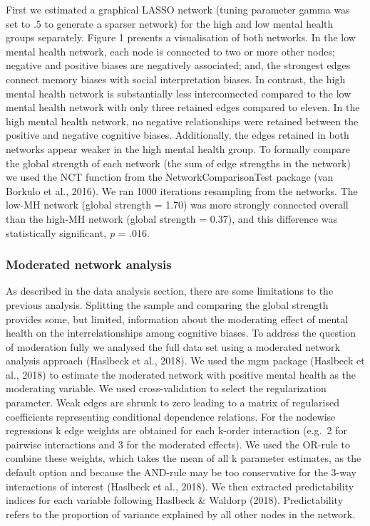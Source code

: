\documentclass[man,floatsintext]{apa6}
\begin{document}
First we estimated a graphical LASSO network (tuning parameter gamma was set to .5 to generate a sparser network) for the high and low mental health groups separately. Figure 1 presents a visualisation of both networks. In the low mental health network, each node is connected to two or more other nodes; negative and positive biases are negatively associated; and, the strongest edges connect memory biases with social interpretation biases. In contrast, the high mental health network is substantially less interconnected compared to the low mental health network with only three retained edges compared to eleven. In the high mental health network, no negative relationships were retained between the positive and negative cognitive biases. Additionally, the edges retained in both networks appear weaker in the high mental health group. To formally compare the global strength of each network (the sum of edge strengths in the network) we used the NCT function from the NetworkComparisonTest package (van Borkulo et al., 2016). We ran 1000 iterations resampling from the networks. The low-MH network (global strength = 1.70) was more strongly connected overall than the high-MH network (global strength = 0.37), and this difference was statistically significant, \emph{p} = .016.

\hypertarget{moderated-network-analysis}{%
\subsubsection{Moderated network analysis}\label{moderated-network-analysis}}

As described in the data analysis section, there are some limitations to the previous analysis. Splitting the sample and comparing the global strength provides some, but limited, information about the moderating effect of mental health on the interrelationships among cognitive biases. To address the question of moderation fully we analysed the full data set using a moderated network analysis approach (Haslbeck et al., 2018). We used the mgm package (Haslbeck et al., 2018) to estimate the moderated network with positive mental health as the moderating variable. We used cross-validation to select the regularization parameter. Weak edges are shrunk to zero leading to a matrix of regularised coefficients representing conditional dependence relations. For the nodewise regressions k edge weights are obtained for each k-order interaction (e.g.~2 for pairwise interactions and 3 for the moderated effects). We used the OR-rule to combine these weights, which takes the mean of all k parameter estimates, as the default option and because the AND-rule may be too conservative for the 3-way interactions of interest (Haslbeck et al., 2018). We then extracted predictability indices for each variable following Haslbeck \& Waldorp (2018). Predictability refers to the proportion of variance explained by all other nodes in the network.
\end{document}
